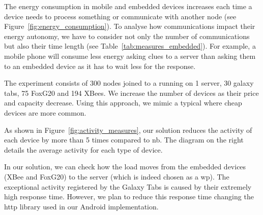 The energy consumption in mobile and embedded devices increases each time a device needs to process something or communicate with another node (see Figure~\ref{fig:energy_consumption}).
To analyse how communications impact their energy autonomy, we have to consider not only the number of communications but also their time length (see Table~\ref{tab:measures_embedded}).
For example, a mobile phone will consume less energy asking clues to a server than asking them to an embedded device as it has to wait less for the response.




The experiment consists of 300 nodes joined to a \Space{} running on 1 server, 30 galaxy tabs, 75 FoxG20 and 194 XBees.
We increase the number of devices as their price and capacity decrease.
Using this approach, we mimic a typical \Space{} where cheap devices are more common.

As shown in Figure~\ref{fig:activity_measures}, our solution reduces the activity of each device by more than 5 times compared to \acl{nb}.
The diagram on the right details the average activity for each type of device.

In our solution, we can check how the load moves from the embedded devices (XBee and FoxG20) to the server (which is indeed chosen as a \ac{wp}).
The exceptional activity registered by the Galaxy Tabs is caused by their extremely high response time.
However, we plan to reduce this response time changing the \acs{http} library used in our Android implementation.



%




